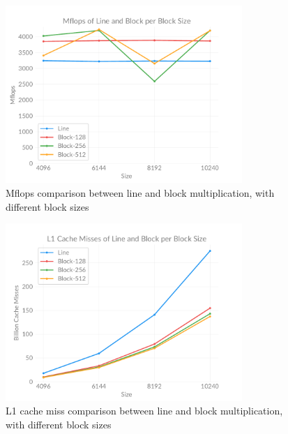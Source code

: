     \begin{figure}[ht]
        \centering
        \captionsetup{justification=centering, margin=2cm}
        \includegraphics[width=0.8\textwidth]{pdf/line-block-flops}
        \caption{Mflops comparison between line and block multiplication, with different block sizes}
        \label{fig:chart:line-block-flops}
    \end{figure}

    \begin{figure}[ht]
        \centering
        \captionsetup{justification=centering, margin=2cm}
        \includegraphics[width=0.8\textwidth]{pdf/line-block-l1}
        \caption{L1 cache miss comparison between line and block multiplication, with different block sizes}
        \label{fig:chart:line-block-l1}
    \end{figure}

